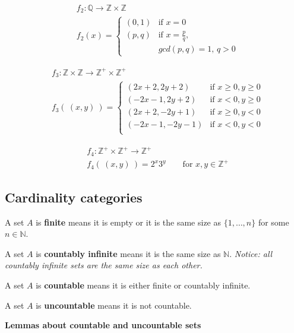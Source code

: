\documentclass[12pt, oneside]{article}
\begin{document}
\begin{align*}
    &f_2: \mathbb{Q} \to \mathbb{Z} \times \mathbb{Z} \\
    &f_2(x) = \begin{cases}
        (0,1) & \text{if $x = 0$} \\
        (p,q) & \text{if $x = \frac{p}{q}$,}\\
                & \text{$gcd(p,q) = 1$, $q > 0$}
    \end{cases}
\end{align*}
\begin{multicols}{2}
\begin{align*}
    &f_3: \mathbb{Z} \times \mathbb{Z} \to \mathbb{Z}^+ \times \mathbb{Z}^+ \\
    &f_3(~(x,y)~) = \begin{cases}
        (2x+2, 2y+2) & \text{if $x \geq 0, y \geq 0$} \\
        (-2x-1, 2y+2) & \text{if $x < 0, y \geq 0$} \\
        (2x+2, -2y+1) & \text{if $x \geq 0, y < 0$} \\
        (-2x-1, -2y-1) & \text{if $x < 0, y < 0$} \\
    \end{cases}
\end{align*}

\begin{align*}
    &f_4: \mathbb{Z}^+ \times \mathbb{Z}^+ \to \mathbb{Z}^+ \\
    &f_4(~(x,y)~) = 2^x 3^y \qquad \text{for $x,y \in \mathbb{Z}^+$}
\end{align*}
\end{multicols} \newpage
\subsection*{Cardinality categories}


A set $A$ is {\bf finite} means it is empty or it is the same size as $\{ 1, \ldots, n \}$ for some $n \in \mathbb{N}$.

A set $A$ is {\bf countably infinite} means it is the same size as $\mathbb{N}$. {\it Notice: 
all countably infinite sets are the same size as each other.}

A set $A$ is {\bf countable} means it is either finite or countably infinite.

A set $A$ is {\bf uncountable} means it is not countable. 

{\bf Lemmas about countable and uncountable sets}
\end{document}
